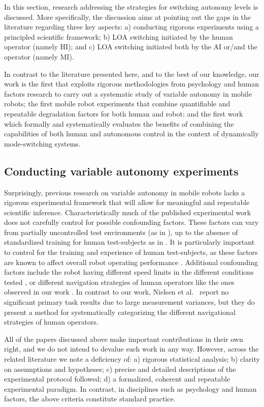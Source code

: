 \documentclass[a4paper,12pt,oneside,openright]{bhamthesis}
\begin{document}
In this section, research addressing the strategies for switching autonomy levels is discussed. More specifically, the discussion aims at pointing out the gaps in the literature regarding three key aspects: a) conducting rigorous experiments using a principled scientific framework; b) LOA switching initiated by the human operator (namely HI); and c) LOA switching initiated both by the AI or/and the operator (namely MI). 

In contrast to the literature presented here, and to the best of our knowledge, our work is the first that exploits rigorous methodologies from psychology and human factors research to carry out a systematic study of variable autonomy in mobile robots; the first mobile robot experiments that combine quantifiable and repeatable degradation factors for both human and robot; and the first work which formally and systematically evaluates the benefits of combining the capabilities of both human and autonomous control in the context of dynamically mode-switching systems. 

\subsection{Conducting variable autonomy experiments}\label{section:framework_lit}
Surprisingly, previous research on variable autonomy in mobile robots lacks a rigorous experimental framework that will allow for meaningful and repeatable scientific inference. Characteristically much of the published experimental work does not carefully control for possible confounding factors. These factors can vary from partially uncontrolled test environments (as in \citep{Marble2004}), up to the absence of standardized training for human test-subjects as in \citep{Bruemmer2005,Few2006, Bruemmer2004}. It is particularly important to control for the training and experience of human test-subjects, as these factors are known to affect overall robot operating performance \citep{Bruemmer2008, Armstrong2015}. Additional confounding factors include the robot having different speed limits in the different conditions tested \citep{Few2006}, or different navigation strategies of human operators like the ones observed in our work \citep{Chiou2015}. In contrast to our work, Nielsen et al.~\citep{Nielsen2008} report no significant primary task results due to large measurement variances, but they do present a method for systematically categorizing the different navigational strategies of human operators.  

All of the papers discussed above make important contributions in their own right, and we do not intend to devalue such work in any way. However, across the related literature we note a deficiency of: a) rigorous statistical analysis; b) clarity on assumptions and hypotheses; c) precise and detailed descriptions of the experimental protocol followed; d) a formalized, coherent and repeatable experimental paradigm. In contrast, in disciplines such as psychology and human factors, the above criteria constitute standard practice.
\end{document}

